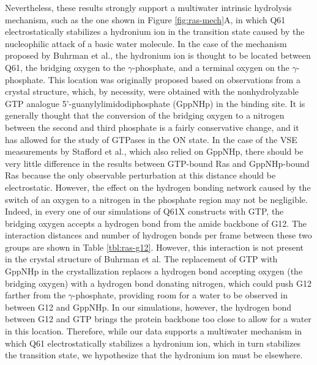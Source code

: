 Nevertheless, these results strongly support a multiwater intrinsic hydrolysis mechanism, such as the one shown in Figure \ref{fig:ras-mech}A, in which Q61 electrostatically stabilizes a hydronium ion in the transition state caused by the nucleophilic attack of a basic water molecule. 
In the case of the mechanism proposed by Buhrman et al., the hydronium ion is thought to be located between Q61, the bridging oxygen to the $\gamma$-phosphate, and a terminal oxygen on the $\gamma$-phosphate. 
This location was originally proposed based on observations from a crystal structure, which, by necessity, were obtained with the nonhydrolyzable GTP analogue 5'-guanylylimidodiphosphate (GppNHp) in the binding site. 
It is generally thought that the conversion of the bridging oxygen to a nitrogen between the second and third phosphate is a fairly conservative change, and it has allowed for the study of GTPases in the ON state. 
In the case of the VSE measurements by Stafford et al., which also relied on GppNHp, there should be very little difference in the results between GTP-bound Ras and GppNHp-bound Ras because the only observable perturbation at this distance should be electrostatic. 
However, the effect on the hydrogen bonding network caused by the switch of an oxygen to a nitrogen in the phosphate region may not be negligible. 
Indeed, in every one of our simulations of Q61X constructs with GTP, the bridging oxygen accepts a hydrogen bond from the amide backbone of G12. 
The interaction distances and number of hydrogen bonds per frame between these two groups are shown in Table \ref{tbl:ras-g12}. 
However, this interaction is not present in the crystal structure of Buhrman et al. 
The replacement of GTP with GppNHp in the crystallization replaces a hydrogen bond accepting oxygen (the bridging oxygen) with a hydrogen bond donating nitrogen, which could push G12 farther from the $\gamma$-phosphate, providing room for a water to be observed in between G12 and GppNHp. 
In our simulations, however, the hydrogen bond between G12 and GTP brings the protein backbone too close to allow for a water in this location. 
Therefore, while our data supports a multiwater mechanism in which Q61 electrostatically stabilizes a hydronium ion, which in turn stabilizes the transition state, we hypothesize that the hydronium ion must be elsewhere.

